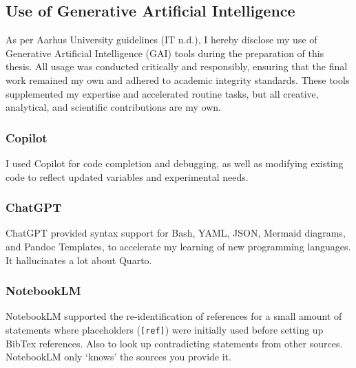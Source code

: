 \documentclass[
  11pt,
  a4paper,
]{scrbook}
\begin{document}
\subsection{Use of Generative Artificial
Intelligence}\label{use-of-generative-artificial-intelligence}

As per Aarhus University guidelines (IT n.d.), I hereby disclose my use
of Generative Artificial Intelligence (GAI) tools during the preparation
of this thesis. All usage was conducted critically and responsibly,
ensuring that the final work remained my own and adhered to academic
integrity standards. These tools supplemented my expertise and
accelerated routine tasks, but all creative, analytical, and scientific
contributions are my own.

\subsubsection{Copilot}\label{copilot}

I used Copilot for code completion and debugging, as well as modifying
existing code to reflect updated variables and experimental needs.

\subsubsection{ChatGPT}\label{chatgpt}

ChatGPT provided syntax support for Bash, YAML, JSON, Mermaid diagrams,
and Pandoc Templates, to accelerate my learning of new programming
languages. It hallucinates a lot about Quarto.

\subsubsection{NotebookLM}\label{notebooklm}

NotebookLM supported the re-identification of references for a small
amount of statements where placeholders (\texttt{{[}ref{]}}) were
initially used before setting up BibTex references. Also to look up
contradicting statements from other sources. NotebookLM only `knows' the
sources you provide it.


\backmatter
\end{document}
